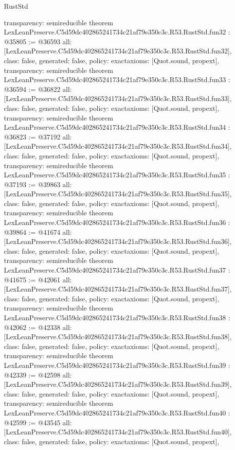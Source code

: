 \begin{lexlean}{RustStd}
\begin{coremodule}
{  transparency: semireducible
}
theorem LexLeanPreserve.C5d59dc402865241734c21af79e350c3c.R53.RustStd.fun32 : @35805 := @36593 {
  all: [LexLeanPreserve.C5d59dc402865241734c21af79e350c3c.R53.RustStd.fun32],
  class: false,
  generated: false,
  policy: exact{axioms: [Quot.sound, propext]},
  transparency: semireducible
}
theorem LexLeanPreserve.C5d59dc402865241734c21af79e350c3c.R53.RustStd.fun33 : @36594 := @36822 {
  all: [LexLeanPreserve.C5d59dc402865241734c21af79e350c3c.R53.RustStd.fun33],
  class: false,
  generated: false,
  policy: exact{axioms: [Quot.sound, propext]},
  transparency: semireducible
}
theorem LexLeanPreserve.C5d59dc402865241734c21af79e350c3c.R53.RustStd.fun34 : @36823 := @37192 {
  all: [LexLeanPreserve.C5d59dc402865241734c21af79e350c3c.R53.RustStd.fun34],
  class: false,
  generated: false,
  policy: exact{axioms: [Quot.sound, propext]},
  transparency: semireducible
}
theorem LexLeanPreserve.C5d59dc402865241734c21af79e350c3c.R53.RustStd.fun35 : @37193 := @39863 {
  all: [LexLeanPreserve.C5d59dc402865241734c21af79e350c3c.R53.RustStd.fun35],
  class: false,
  generated: false,
  policy: exact{axioms: [Quot.sound, propext]},
  transparency: semireducible
}
theorem LexLeanPreserve.C5d59dc402865241734c21af79e350c3c.R53.RustStd.fun36 : @39864 := @41674 {
  all: [LexLeanPreserve.C5d59dc402865241734c21af79e350c3c.R53.RustStd.fun36],
  class: false,
  generated: false,
  policy: exact{axioms: [Quot.sound, propext]},
  transparency: semireducible
}
theorem LexLeanPreserve.C5d59dc402865241734c21af79e350c3c.R53.RustStd.fun37 : @41675 := @42061 {
  all: [LexLeanPreserve.C5d59dc402865241734c21af79e350c3c.R53.RustStd.fun37],
  class: false,
  generated: false,
  policy: exact{axioms: [Quot.sound, propext]},
  transparency: semireducible
}
theorem LexLeanPreserve.C5d59dc402865241734c21af79e350c3c.R53.RustStd.fun38 : @42062 := @42338 {
  all: [LexLeanPreserve.C5d59dc402865241734c21af79e350c3c.R53.RustStd.fun38],
  class: false,
  generated: false,
  policy: exact{axioms: [Quot.sound, propext]},
  transparency: semireducible
}
theorem LexLeanPreserve.C5d59dc402865241734c21af79e350c3c.R53.RustStd.fun39 : @42339 := @42598 {
  all: [LexLeanPreserve.C5d59dc402865241734c21af79e350c3c.R53.RustStd.fun39],
  class: false,
  generated: false,
  policy: exact{axioms: [Quot.sound, propext]},
  transparency: semireducible
}
theorem LexLeanPreserve.C5d59dc402865241734c21af79e350c3c.R53.RustStd.fun40 : @42599 := @43545 {
  all: [LexLeanPreserve.C5d59dc402865241734c21af79e350c3c.R53.RustStd.fun40],
  class: false,
  generated: false,
  policy: exact{axioms: [Quot.sound, propext]},
}
\end{coremodule}
\end{lexlean}
